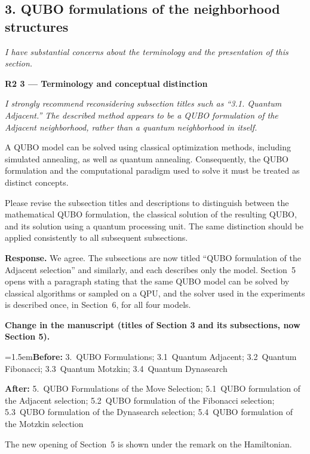\documentclass[12pt]{article}
\newenvironment{rc}[1]{\par\medskip\noindent\textbf{#1}\par\nopagebreak\noindent\itshape\renewcommand{\emph}[1]{\textbf{##1}}\ignorespaces}{\par}
\newenvironment{lead}{\par\medskip\noindent\itshape\renewcommand{\emph}[1]{\textbf{##1}}\ignorespaces}{\par}
\newcommand{\answer}[1]{\par\smallskip\noindent\textbf{Response.} #1\par}
\newcommand{\change}[3]{\par\smallskip\noindent\textbf{Change in the manuscript (#1).}\par
  {\leftskip=1.5em\noindent\textbf{Before:} #2\par\noindent\textbf{After:} #3\par}}
\begin{document}
\subsection*{3. QUBO formulations of the neighborhood structures}

\begin{lead}
I have substantial concerns about the terminology and the presentation of this section.
\end{lead}

\begin{rc}{R2 3 --- Terminology and conceptual distinction}
I strongly recommend reconsidering subsection titles such as ``3.1. Quantum Adjacent.'' The described method appears to be a QUBO formulation of the Adjacent neighborhood, rather than a quantum neighborhood in itself.

A QUBO model can be solved using classical optimization methods, including simulated annealing, as well as quantum annealing. Consequently, the QUBO formulation and the computational paradigm used to solve it must be treated as distinct concepts.

Please revise the subsection titles and descriptions to distinguish between the mathematical QUBO formulation, the classical solution of the resulting QUBO, and its solution using a quantum processing unit. The same distinction should be applied consistently to all subsequent subsections.
\end{rc}
\answer{We agree. The subsections are now titled ``QUBO formulation of the Adjacent selection'' and similarly, and each describes only the model. Section~5 opens with a paragraph stating that the same QUBO model can be solved by classical algorithms or sampled on a QPU, and the solver used in the experiments is described once, in Section~6, for all four models.}
\change{titles of Section 3 and its subsections, now Section 5}{3.~QUBO Formulations; 3.1~Quantum Adjacent; 3.2~Quantum Fibonacci; 3.3~Quantum Motzkin; 3.4~Quantum Dynasearch}{5.~QUBO Formulations of the Move Selection; 5.1~QUBO formulation of the Adjacent selection; 5.2~QUBO formulation of the Fibonacci selection; 5.3~QUBO formulation of the Dynasearch selection; 5.4~QUBO formulation of the Motzkin selection}
The new opening of Section~5 is shown under the remark on the Hamiltonian.
\end{document}
